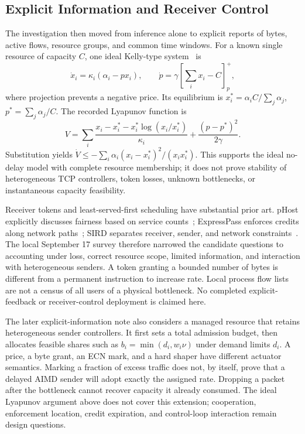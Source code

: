 \documentclass[conference,letterpaper]{IEEEtran}
\begin{document}
\subsection{Explicit Information and Receiver Control}
The investigation then moved from inference alone to explicit reports of bytes, active flows, resource groups, and common time windows. For a known single resource of capacity $C$, one ideal Kelly-type system~\cite{kelly} is
\begin{equation}
\dot x_i=\kappa_i(\alpha_i-px_i),\qquad
\dot p=\gamma[\textstyle\sum_i x_i-C]^+_p,
\label{eq:price}
\end{equation}
where projection prevents a negative price. Its equilibrium is $x_i^*=\alpha_i C/\sum_j\alpha_j$, $p^*=\sum_j\alpha_j/C$. The recorded Lyapunov function is
\begin{equation}
V=\sum_i\frac{x_i-x_i^*-x_i^*\log(x_i/x_i^*)}{\kappa_i}
+\frac{(p-p^*)^2}{2\gamma}.
\end{equation}
Substitution yields $\dot V\le-\sum_i\alpha_i(x_i-x_i^*)^2/(x_ix_i^*)$. This supports the ideal no-delay model with complete resource membership; it does not prove stability of heterogeneous TCP controllers, token losses, unknown bottlenecks, or instantaneous capacity feasibility.

Receiver tokens and least-served-first scheduling have substantial prior art. pHost explicitly discusses fairness based on service counts~\cite{phost}; ExpressPass enforces credits along network paths~\cite{xpass}; SIRD separates receiver, sender, and network constraints~\cite{sird}. The local September 17 survey therefore narrowed the candidate questions to accounting under loss, correct resource scope, limited information, and interaction with heterogeneous senders. A token granting a bounded number of bytes is different from a permanent instruction to increase rate. Local process flow lists are not a census of all users of a physical bottleneck. No completed explicit-feedback or receiver-control deployment is claimed here.

The later explicit-information note also considers a managed resource that retains heterogeneous sender controllers. It first sets a total admission budget, then allocates feasible shares such as $b_i=\min(d_i,w_i\nu)$ under demand limits $d_i$. A price, a byte grant, an ECN mark, and a hard shaper have different actuator semantics. Marking a fraction of excess traffic does not, by itself, prove that a delayed AIMD sender will adopt exactly the assigned rate. Dropping a packet after the bottleneck cannot recover capacity it already consumed. The ideal Lyapunov argument above does not cover this extension; cooperation, enforcement location, credit expiration, and control-loop interaction remain design questions.
\end{document}
